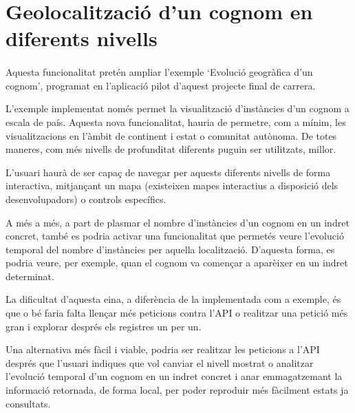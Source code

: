 \section{Geolocalització d'un cognom en diferents nivells}

    \paragraph{}
    Aquesta funcionalitat pretén ampliar l'exemple `Evolució geogràfica d'un cognom', programat en l'aplicació pilot d'aquest projecte final de carrera.

    L'exemple implementat només permet la visualització d'instàncies d'un cognom a escala de país. Aquesta nova funcionalitat, hauria de permetre, com a mínim, les visualitzacions en l'àmbit de continent i estat o comunitat autònoma. De totes maneres, com més nivells de profunditat diferents puguin ser utilitzats, millor.

    L'usuari haurà de ser capaç de navegar per aquests diferents nivells de forma interactiva, mitjançant un mapa (existeixen mapes interactius a disposició dels desenvolupadors) o controls específics.

    A més a més, a part de plasmar el nombre d'instàncies d'un cognom en un indret concret, també es podria activar una funcionalitat que permetés veure l'evolució temporal del nombre d'instàncies per aquella localització. D'aquesta forma, es podria veure, per exemple, quan el cognom va començar a aparèixer en un indret determinat.

    La dificultat d'aquesta eina, a diferència de la implementada com a exemple, és que o bé faria falta llençar més peticions contra l'API o realitzar una petició més gran i explorar després els registres un per un.

    Una alternativa més fàcil i viable, podria ser realitzar les peticions a l'API després que l'usuari indiques que vol canviar el nivell mostrat o analitzar l'evolució temporal d'un cognom en un indret concret i anar emmagatzemant la informació retornada, de forma local, per poder reproduir més fàcilment estats ja consultats.
